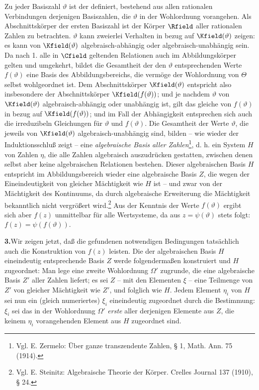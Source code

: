\documentclass[11pt]{article}
\begin{document}
Zu jeder Basiszahl \(\vartheta\) ist der  definiert, bestehend aus allen rationalen Verbindungen derjenigen Basiszahlen, die \(\vartheta\) in der Wohlordnung vorangehen. Als Abschnittskörper der ersten Basiszahl ist der Körper \(\Rfield\) aller rationalen Zahlen zu betrachten. \(\vartheta\) kann zweierlei Verhalten in bezug auf \(\Kfield(\vartheta)\) zeigen: es kann von \(\Kfield(\vartheta)\) algebraisch-abhängig oder algebraisch-unabhängig sein. Da nach 1. alle in \(\Cfield\) geltenden Relationen auch im Abbildungskörper gelten und umgekehrt, bildet die Gesamtheit der den \(\vartheta\) entsprechenden Werte \(f(\vartheta)\) eine Basis des Abbildungsbereichs, die vermöge der Wohlordnung von \(\Theta\) selbst wohlgeordnet ist. Dem Abschnittskörper \(\Kfield(\vartheta)\) entspricht also insbesondere der Abschnittskörper \(\Kfield(f(\vartheta))\); und je nachdem \(\vartheta\) von \(\Kfield(\vartheta)\) algebraisch-abhängig oder unabhängig ist, gilt das gleiche von \(f(\vartheta)\) in bezug auf \(\Kfield(f(\vartheta))\); und im Fall der Abhängigkeit entsprechen sich auch die irreduzibeln Gleichungen für \(\vartheta\) und \(f(\vartheta)\). Die Gesamtheit der Werte \(\vartheta\), die jeweils von \(\Kfield(\vartheta)\) algebraisch-unabhängig sind, bilden -- wie wieder der Induktionsschluß zeigt -- eine \emph{algebraische Basis aller Zahlen}\footnote{Vgl. E. Zermelo: Über ganze transzendente Zahlen, § 1, Math. Ann. 75 (1914).}, d. h. ein System \(H\) von Zahlen \(\eta\), die alle Zahlen algebraisch auszudrücken gestatten, zwischen denen selbst aber keine algebraischen Relationen bestehen. Dieser algebraischen Basis \(H\) entspricht im Abbildungsbereich wieder eine algebraische Basis \(Z\), die wegen der Eineindeutigkeit von gleicher Mächtigkeit wie \(H\) ist -- und zwar von der Mächtigkeit des Kontinuums, da durch algebraische Erweiterung die Mächtigkeit bekanntlich nicht vergrößert wird.\footnote{Vgl. E. Steinitz: Algebraische Theorie der Körper. Crelles Journal 137 (1910), § 24.} Aus der Kenntnis der Werte \(f(\vartheta)\) ergibt sich aber \(f(z)\) unmittelbar für alle Wertsysteme, da aus \(z=\psi(\vartheta)\) stets folgt: \(f(z)=\psi(f(\vartheta))\).

\medskip
\noindent\textbf{3.}\quad Wir zeigen jetzt, daß die gefundenen notwendigen Bedingungen tatsächlich auch die Konstruktion von \(f(z)\) leisten. Die der algebraischen Basis \(H\) eineindeutig entsprechende Basis \(Z\) werde folgendermaßen konstruiert und \(H\) zugeordnet: Man lege eine zweite Wohlordnung \(\Omega'\) zugrunde, die eine algebraische Basis \(Z'\) aller Zahlen liefert; es sei \(Z\) -- mit den Elementen \(\xi\) -- eine Teilmenge von \(Z'\) von gleicher Mächtigkeit wie \(Z'\), und folglich wie \(H\). Jedem Element \(\eta_i\) von \(H\) sei nun ein (gleich numeriertes) \(\xi_i\) eineindeutig zugeordnet durch die Bestimmung: \(\xi_i\) sei das in der Wohlordnung \(\Omega'\) \emph{erste} aller derjenigen Elemente aus \(Z\), die keinem \(\eta_i\) vorangehenden Element aus \(H\) zugeordnet sind.
\end{document}

